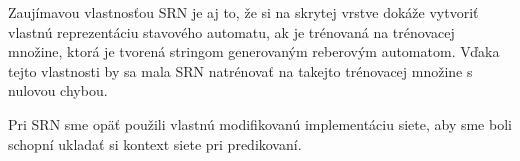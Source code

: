 Zaujímavou vlastnosťou SRN je aj to, že si na skrytej vrstve dokáže vytvoriť vlastnú reprezentáciu stavového automatu, ak 
je trénovaná na trénovacej množine, ktorá je tvorená stringom generovaným reberovým automatom. Vďaka tejto vlastnosti
by sa mala SRN natrénovať na takejto trénovacej množine s nulovou chybou.



Pri SRN sme opäť použili vlastnú modifikovanú implementáciu siete, aby sme boli schopní
ukladať si kontext siete pri predikovaní.






